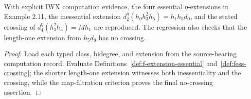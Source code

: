\begin{proposition}
  \label{prop:eta-ess-regression}
  \notready
  With explicit IWX computation evidence, the four essential
  $\eta$-extensions in Example 2.11, the inessential extension
  $d_2^\eta(h_0h_3^2h_5)=h_1h_5d_0$, and the stated crossing of
  $d_4^\eta(h_3^2h_5)=Mh_1$ are reproduced.  The regression also checks that
  the length-one extension from $h_5d_0$ has no crossing.
\end{proposition}

\begin{proof}
  Load each typed class, bidegree, and extension from the source-bearing
  computation record.  Evaluate Definitions~\ref{def:f-extension-essential}
  and~\ref{def:fess-crossing}; the shorter length-one extension witnesses both
  inessentiality and the crossing, while the map-filtration criterion proves
  the final no-crossing assertion.
\end{proof}
